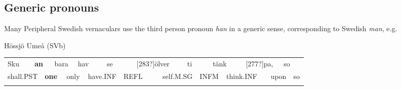 \subsection{\rmfamily Generic pronouns}

\begin{styleBodyTextFirst}
Many Peripheral Swedish vernaculars use the third person pronoun \textit{han} in a generic sense, corresponding to Swedish \textit{man}, e.g.

\end{styleBodyTextFirst}

\begin{listWWNumileveli}
\item {}

\begin{styleExample}
Hössjö Umeå (SVb)

\end{styleExample}

\end{listWWNumileveli}

\begin{tabular}{llllllllllllllllllll}
\lsptoprule
Sku & \multicolumn{2}{l}{{\bfseries an}

} & \multicolumn{2}{l}{bara

} & \multicolumn{2}{l}{hav

} & \multicolumn{2}{l}{se

} & \multicolumn{2}{l}{[283?]ölver

} & \multicolumn{2}{l}{ti

} & \multicolumn{2}{l}{tänk

} & \multicolumn{2}{l}{[277?]pa,

} & \multicolumn{2}{l}{so

} & \\
\multicolumn{2}{l}{shall.PST

} & \multicolumn{2}{l}{{\bfseries one}

} & \multicolumn{2}{l}{only

} & \multicolumn{2}{l}{have.INF

} & \multicolumn{2}{l}{REFL

} & \multicolumn{2}{l}{self.M.SG

} & \multicolumn{2}{l}{INFM

} & \multicolumn{2}{l}{think.INF

} & \multicolumn{2}{l}{upon

} & \multicolumn{2}{l}{so

}\\
\lspbottomrule
\end{tabular}

